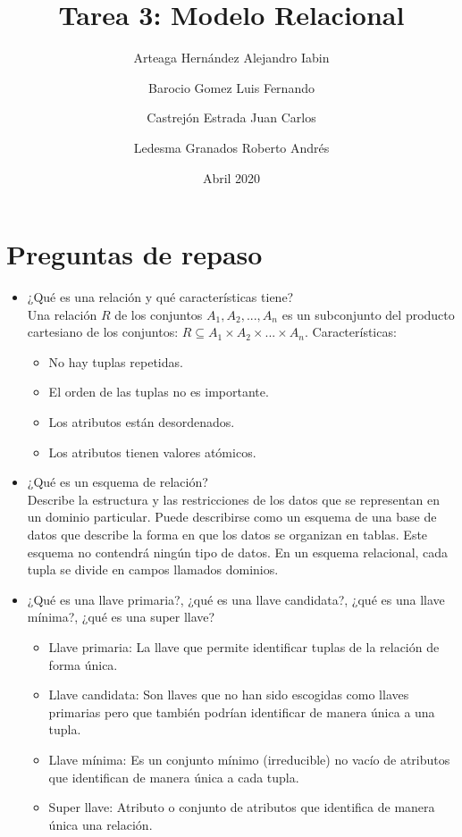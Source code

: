 \documentclass{article}
\title{Tarea 3: Modelo Relacional}
\author{Arteaga Hernández Alejandro Iabin \and
Barocio Gomez Luis Fernando \and
Castrejón Estrada Juan Carlos \and
Ledesma Granados Roberto Andrés }
\date{Abril 2020}
\begin{document}
\maketitle
\section{Preguntas de repaso}
\begin{itemize}
    \item ¿Qué es una relación y qué características tiene?\\
    Una relación $R$ de los conjuntos $A_1, A_2, ..., A_n$ es un subconjunto del producto cartesiano de los conjuntos: $R \subseteq A_1 \times A_2 \times ... \times A_n$. Características: 
    \begin{itemize}
        \item No hay tuplas repetidas.
        \item El orden de las tuplas no es importante.
        \item Los atributos están desordenados.
        \item Los atributos tienen valores atómicos.
    \end{itemize}
    \item ¿Qué es un esquema de relación? \\
    Describe la estructura y las restricciones de los datos que se representan en un dominio particular. Puede describirse como un esquema de una base de datos que describe la forma en que los datos se organizan en tablas. Este esquema no contendrá ningún tipo de datos. En un esquema relacional, cada tupla se divide en campos llamados dominios.
    \item ¿Qué es una llave primaria?, ¿qué es una llave candidata?, ¿qué es una llave mínima?, ¿qué es una super llave?
    \begin{itemize}
        \item Llave primaria: La llave que permite identificar tuplas de la relación de forma única.
        \item Llave candidata: Son llaves que no han sido escogidas como llaves primarias pero que también podrían identificar de manera única a una tupla.
        \item Llave mínima: Es un conjunto mínimo (irreducible) no vacío de atributos que identifican de manera única a cada tupla.
        \item Super llave: Atributo o conjunto de atributos que identifica de manera única una relación.
    \end{itemize}

\end{itemize}
\end{document}
